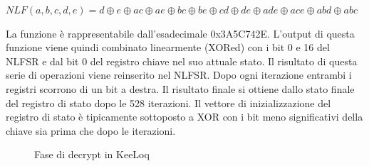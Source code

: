 \begin{center}
  \(NLF(a, b, c, d, e) = d \oplus e \oplus ac \oplus ae \oplus bc \oplus be \oplus cd \oplus de \oplus ade \oplus ace \oplus abd \oplus abc\) \cite{keeloqwiki,keeloqc,algebraic_slide,cryptoeprint}
\end{center}
La funzione è rappresentabile dall’esadecimale 0x3A5C742E. L’output di questa funzione viene quindi combinato linearmente (XORed) con i bit 0 e 16 del NLFSR e dal bit 0 del registro chiave nel suo attuale stato. Il risultato di questa serie di operazioni viene reinserito nel NLFSR. Dopo ogni iterazione entrambi i registri scorrono di un bit a destra. Il risultato finale si ottiene dallo stato finale del registro di stato dopo le 528 iterazioni. Il vettore di inizializzazione del registro di stato è tipicamente sottoposto a XOR con i bit meno significativi della chiave sia prima che dopo le iterazioni.\\

\begin{figure} %
  \centering
  \def\stackalignment{r} %
  {\scriptsize}
  \caption{Fase di decrypt in KeeLoq \cite{keeloqwiki}}
  \label{fig:keeloq_decrypt}
\end{figure}

